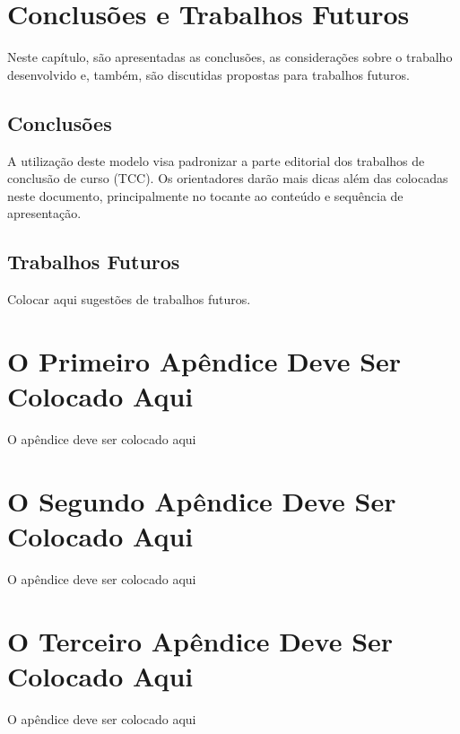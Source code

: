 \documentclass[
        oneside,      %
        english,			
        brazil			 
        ]{configcefetmglpd}
\begin{document}
\chapter{Conclusões e Trabalhos Futuros}

Neste capítulo, são apresentadas as conclusões, as considerações sobre o trabalho desenvolvido e, também, são discutidas propostas para trabalhos futuros.

\section{Conclusões}
A utilização deste modelo visa padronizar a parte editorial dos trabalhos de conclusão de curso (TCC). Os orientadores darão mais dicas além das colocadas neste documento, principalmente no tocante ao conteúdo e sequência de apresentação.

\section{Trabalhos Futuros}
Colocar aqui sugestões de trabalhos futuros.


\postextual 





\begin{apendices}

\chapter{\apendseq O Primeiro Apêndice Deve Ser Colocado Aqui} 

O apêndice deve ser colocado aqui


\chapter{\apendseq O Segundo Apêndice Deve Ser Colocado Aqui} 

O apêndice deve ser colocado aqui 


\chapter{\apendseq O Terceiro Apêndice Deve Ser Colocado Aqui} 

O apêndice deve ser colocado aqui 


\end{apendices}
\end{document}
